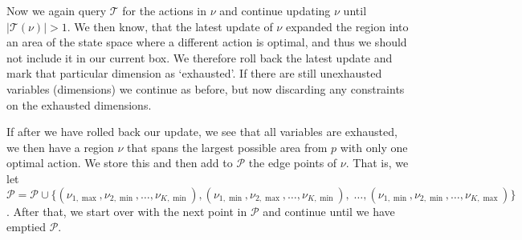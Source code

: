 Now we again query $\mathcal{T}$ for the actions in $\nu$ and continue updating
$\nu$ until $|\mathcal{T}(\nu)| > 1$. We then know, that the latest
update of $\nu$ expanded the region into an area of the state space where a different
action is optimal, and thus we should not include it in our current box. We
therefore roll back the latest update and mark that particular dimension as
`exhausted'. If there are still unexhausted variables (dimensions) we continue
as before, but now discarding any constraints on the exhausted dimensions.

If after we have rolled back our update, we see that all variables are
exhausted, we then have a region $\nu$ that spans the largest possible area from
$p$ with only one optimal action. We store this and then add to $\mathcal{P}$
the edge points of $\nu$.  That is, we let $\mathcal{P} = \mathcal{P} \cup \{
(\nu_{1,\max}, \nu_{2,\min}, \ldots, \nu_{K,\min} ), (\nu_{1,\min},
\nu_{2,\max}, \ldots, \nu_{K,\min}), \;\ldots,\allowbreak (\nu_{1,\min},
\nu_{2,\min}, \ldots, \nu_{K,\max}) \}$.  After that, we start over with the
next point in $\mathcal{P}$ and continue until we have emptied $\mathcal{P}$.




